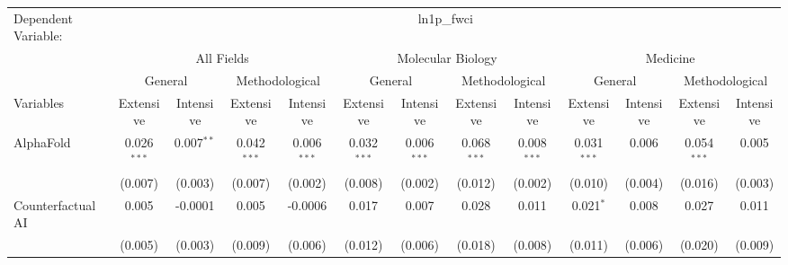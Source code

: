 \begingroup
\centering
\begin{tabular}{lcccccccccccc}
   \tabularnewline \midrule \midrule
   Dependent Variable: & \multicolumn{12}{c}{ln1p\_fwci}\\
 & \multicolumn{4}{c}{All Fields} & \multicolumn{4}{c}{Molecular Biology} & \multicolumn{4}{c}{Medicine} \\
\cmidrule(lr){2-5} \cmidrule(lr){6-9} \cmidrule(lr){10-13}
 & \multicolumn{2}{c}{General} & \multicolumn{2}{c}{Methodological} & \multicolumn{2}{c}{General} & \multicolumn{2}{c}{Methodological} & \multicolumn{2}{c}{General} & \multicolumn{2}{c}{Methodological} \\
\cmidrule(lr){2-3} \cmidrule(lr){4-5} \cmidrule(lr){6-7} \cmidrule(lr){8-9} \cmidrule(lr){10-11} \cmidrule(lr){12-13}
Variables & \multicolumn{1}{c}{Extensive} & \multicolumn{1}{c}{Intensive} & \multicolumn{1}{c}{Extensive} & \multicolumn{1}{c}{Intensive} & \multicolumn{1}{c}{Extensive} & \multicolumn{1}{c}{Intensive} & \multicolumn{1}{c}{Extensive} & \multicolumn{1}{c}{Intensive} & \multicolumn{1}{c}{Extensive} & \multicolumn{1}{c}{Intensive} & \multicolumn{1}{c}{Extensive} & \multicolumn{1}{c}{Intensive} \\
\cmidrule(lr){1-1}\cmidrule(lr){2-2} \cmidrule(lr){3-3} \cmidrule(lr){4-4} \cmidrule(lr){5-5} \cmidrule(lr){6-6} \cmidrule(lr){7-7} \cmidrule(lr){8-8} \cmidrule(lr){9-9} \cmidrule(lr){10-10} \cmidrule(lr){11-11} \cmidrule(lr){12-12} \cmidrule(lr){13-13}
   AlphaFold                                & 0.026$^{***}$ & 0.007$^{**}$   & 0.042$^{***}$ & 0.006$^{***}$  & 0.032$^{***}$ & 0.006$^{***}$ & 0.068$^{***}$ & 0.008$^{***}$ & 0.031$^{***}$ & 0.006           & 0.054$^{***}$ & 0.005\\   
                                            & (0.007)       & (0.003)        & (0.007)       & (0.002)        & (0.008)       & (0.002)       & (0.012)       & (0.002)       & (0.010)       & (0.004)         & (0.016)       & (0.003)\\   
   Counterfactual AI                        & 0.005         & -0.0001        & 0.005         & -0.0006        & 0.017         & 0.007         & 0.028         & 0.011         & 0.021$^{*}$   & 0.008           & 0.027         & 0.011\\   
                                            & (0.005)       & (0.003)        & (0.009)       & (0.006)        & (0.012)       & (0.006)       & (0.018)       & (0.008)       & (0.011)       & (0.006)         & (0.020)       & (0.009)\\   

\end{tabular}
